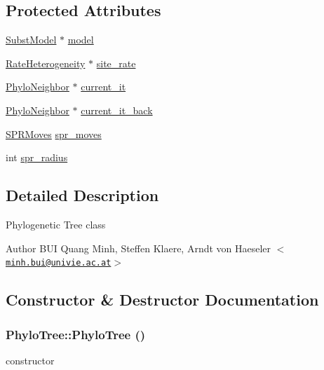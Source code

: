 \subsection*{Protected Attributes}
\begin{DoxyCompactItemize}
\item 
\hyperlink{classSubstModel}{SubstModel} $\ast$ \hyperlink{classPhyloTree_affd265bc9cd055d0f59bfda46c98387b}{model}
\item 
\hyperlink{classRateHeterogeneity}{RateHeterogeneity} $\ast$ \hyperlink{classPhyloTree_a9b7513b9bfee50bcd6cbe97a87366c4d}{site\_\-rate}
\item 
\hyperlink{classPhyloNeighbor}{PhyloNeighbor} $\ast$ \hyperlink{classPhyloTree_a9a11206ad156f382ee0db5f92dd399ce}{current\_\-it}
\item 
\hyperlink{classPhyloNeighbor}{PhyloNeighbor} $\ast$ \hyperlink{classPhyloTree_a5016a4372500fe919bfa09b713cd2344}{current\_\-it\_\-back}
\item 
\hyperlink{classSPRMoves}{SPRMoves} \hyperlink{classPhyloTree_a0ec867545e10bf1a45c938ed5c4a43f1}{spr\_\-moves}
\item 
int \hyperlink{classPhyloTree_a63a5b49b525b22534b525d7a35e663c7}{spr\_\-radius}
\end{DoxyCompactItemize}


\subsection{Detailed Description}
Phylogenetic Tree class

\begin{DoxyAuthor}{Author}
BUI Quang Minh, Steffen Klaere, Arndt von Haeseler $<$\href{mailto:minh.bui@univie.ac.at}{\tt minh.bui@univie.ac.at}$>$ 
\end{DoxyAuthor}


\subsection{Constructor \& Destructor Documentation}
\hypertarget{classPhyloTree_ab6e00efe0c10f4a93d34e7d027489ac6}{
\subsubsection[{PhyloTree}]{\setlength{\rightskip}{0pt plus 5cm}PhyloTree::PhyloTree ()}}
\label{classPhyloTree_ab6e00efe0c10f4a93d34e7d027489ac6}
constructor 

